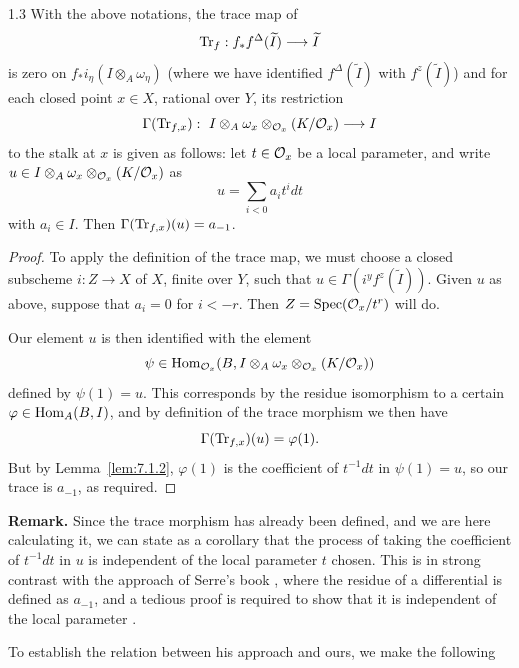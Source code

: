 \begin{bookproposition}{1.3}\label{prop:7.1.3}
With the above notations, the trace map of 
\[
\operatorname{Tr}_{f} : f_{*}f^{\Delta}(\widetilde{I}) \longrightarrow \widetilde{I}
\]
is zero on $f_{*}i_{\eta}(I \otimes_{A} \omega_{\eta})$ (where we have identified $f^{\Delta}(\widetilde{I})$ with $f^{z}(\widetilde{I})$) and for each closed point $x \in X$, rational over $Y$, its restriction
\[
\Gamma(\operatorname{Tr}_{f,x}): \ I \otimes_{A} \omega_{x} \otimes_{\mathcal{O}_x} (K/\mathcal{O}_{x}) \longrightarrow I
\]
to the stalk at $x$ is given as follows: let $t \in \mathcal{O}_{x}$ be a local parameter, and write $u \in I \otimes_{A} \omega_{x} \otimes_{\mathcal{O}_x} (K/\mathcal{O}_{x})$ as
\[
u = \sum_{i < 0} a_{i} t^{i} dt
\]
with $a_{i} \in I$. Then $\Gamma(\operatorname{Tr}_{f,x})(u) = a_{-1}$.
\end{bookproposition}

\begin{proof}
To apply the definition of the trace map, we must choose a closed subscheme $i: Z \to X$ of $X$, finite over $Y$, such that $u \in \Gamma(i^{y}f^{z}(\widetilde{I}))$. Given $u$ as above, suppose that $a_{i} = 0$ for $i < -r$. Then $Z = \operatorname{Spec}(\mathcal{O}_{x}/t^{r})$ will do.

Our element $u$ is then identified with the element
\[
\psi \in \operatorname{Hom}_{\mathcal{O}_{x}}(B, I \otimes_{A} \omega_{x} \otimes_{\mathcal{O}_x} (K/\mathcal{O}_{x}))
\]
defined by $\psi(1) = u$. This corresponds by the residue isomorphism to a certain $\varphi \in \operatorname{Hom}_{A}(B, I)$, and by definition of the trace morphism we then have
\[
\Gamma(\operatorname{Tr}_{f,x})(u) = \varphi(1).
\]
But by Lemma~\ref{lem:7.1.2}, $\varphi(1)$ is the coefficient of $t^{-1}dt$ in $\psi(1) = u$, so our trace is $a_{-1}$, as required.
\end{proof}

\par\medskip\noindent\textbf{Remark.}
Since the trace morphism has already been defined, and we are here calculating it, we can state as a corollary that the process of taking the coefficient of $t^{-1}dt$ in $u$ is independent of the local parameter $t$ chosen. This is in strong contrast with the approach of Serre's book \cite[\nopp Ch.~II,~\S7]{16}, where the residue of a differential is defined as $a_{-1}$, and a tedious proof is required to show that it is independent of the local parameter \cite[\nopp Ch.~II,~\S7, Prop.~5]{16}.
\par\medskip

To establish the relation between his approach and ours, we make the following


